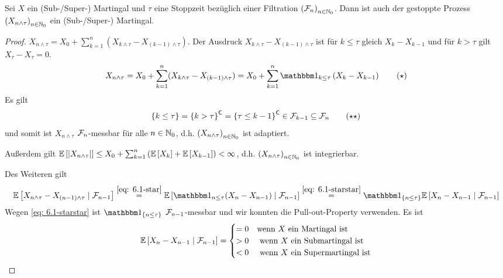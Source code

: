 \begin{theorem}
	\label{theorem: 6.1}
	Sei $X$ ein (Sub-/Super-) Martingal und $\tau$ eine Stoppzeit bezüglich einer Filtration $\left( \mathcal{F}_n \right)_{n \in \mathbb{N}_0}$. Dann ist auch der gestoppte Prozess $\left( X_{n \land \tau} \right)_{n \in \mathbb{N}_0}$ ein (Sub-/Super-) Martingal.
\end{theorem}
\begin{proof}
	$X_{n \land \tau} = X_0 + \sum_{k=1}^n (X_{k \land \tau} - X_{(k-1) \land \tau})$. Der Ausdruck $X_{k \land \tau} - X_{(k-1) \land \tau}$ ist für $k \le \tau$ gleich $X_k - X_{k-1}$ und für $k > \tau$ gilt $X_\tau - X_\tau = 0$.
	\begin{equation*}
		X_{n \land \tau} = X_0 + \sum_{k=1}^n (X_{k \land \tau} - X_{(k-1) \land \tau}) = X_0 + \sum_{k=1}^n \one_{k \le \tau} \brackets{X_k - X_{k-1}} 
		\tag{$\star$} \label{eq: 6.1-star}
	\end{equation*}
	Es gilt
	\begin{equation*}
		\left\{ k \le \tau \right\} = \left\{ k > \tau \right\}^{\mathsf{C}} = \left\{ \tau \le k-1 \right\}^{\mathsf{C}} \in \mathcal{F}_{k-1} \subseteq \mathcal{F}_n 
		\tag{$\star\star$} \label{eq: 6.1-starstar}
	\end{equation*}
	und somit ist $X_{n \land \tau}$ $\mathcal{F}_n$-messbar für alle $n \in \mathbb{N}_0$, d.h. $\left( X_{n \land \tau} \right)_{n \in \mathbb{N}_0}$ ist adaptiert.
	
	Außerdem gilt $\mathbb{E} \left[ \left| X_{n \land \tau} \right| \right] \le X_0 + \sum_{k=1}^n \left( \mathbb{E} \left[ X_k \right] + \mathbb{E} \left[ X_{k-1} \right] \right) < \infty$, d.h. $\left( X_{n \land \tau} \right)_{n \in \mathbb{N}_0}$ ist integrierbar.
	
	Des Weiteren gilt
	\begin{equation*}
		\EW[X_{n \land \tau} - X_{(n-1) \land \tau} \mid \F_{n-1}] \overset{\eqref{eq: 6.1-star}}{=} \EW[\one_{n \le \tau} (X_n - X_{n-1}) \mid \F_{n-1}]  \overset{\eqref{eq: 6.1-starstar}}{=} \one_{\menge{n \le \tau}} \EW[X_n - X_{n-1} \mid \F_{n-1}]
	\end{equation*}
	Wegen \eqref{eq: 6.1-starstar} ist $\one_{\menge{n \le \tau}}$ $\mathcal{F}_{n-1}$-messbar und wir konnten die Pull-out-Property verwenden. Es ist
	\begin{equation*}
		\mathbb{E} \left[ X_n - X_{n-1} \mid \mathcal{F}_{n-1} \right] = \begin{cases}
		= 0 &\text{wenn $X$ ein Martingal ist} \\
		> 0 &\text{ wenn $X$ ein Submartingal ist} \\
		< 0 &\text{ wenn $X$ ein Supermartingal ist}
		\end{cases}
	\end{equation*}
\end{proof}

